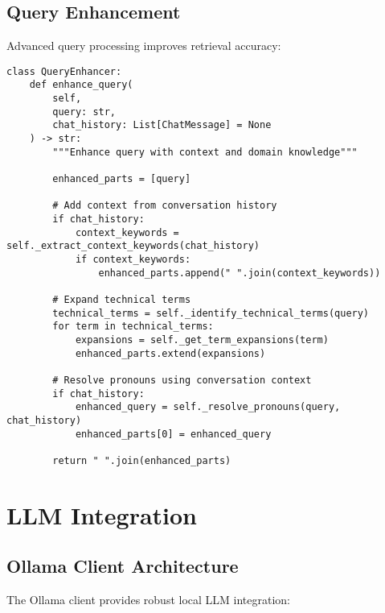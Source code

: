 \documentclass[10pt,a4paper,twocolumn]{article}
\begin{document}
\subsection{Query Enhancement}

Advanced query processing improves retrieval accuracy:

\begin{lstlisting}[caption={Query Enhancement Algorithm}]
class QueryEnhancer:
    def enhance_query(
        self, 
        query: str, 
        chat_history: List[ChatMessage] = None
    ) -> str:
        """Enhance query with context and domain knowledge"""
        
        enhanced_parts = [query]
        
        # Add context from conversation history
        if chat_history:
            context_keywords = self._extract_context_keywords(chat_history)
            if context_keywords:
                enhanced_parts.append(" ".join(context_keywords))
        
        # Expand technical terms
        technical_terms = self._identify_technical_terms(query)
        for term in technical_terms:
            expansions = self._get_term_expansions(term)
            enhanced_parts.extend(expansions)
        
        # Resolve pronouns using conversation context
        if chat_history:
            enhanced_query = self._resolve_pronouns(query, chat_history)
            enhanced_parts[0] = enhanced_query
        
        return " ".join(enhanced_parts)
\end{lstlisting}

\section{LLM Integration}

\subsection{Ollama Client Architecture}

The Ollama client provides robust local LLM integration:
\end{document}
